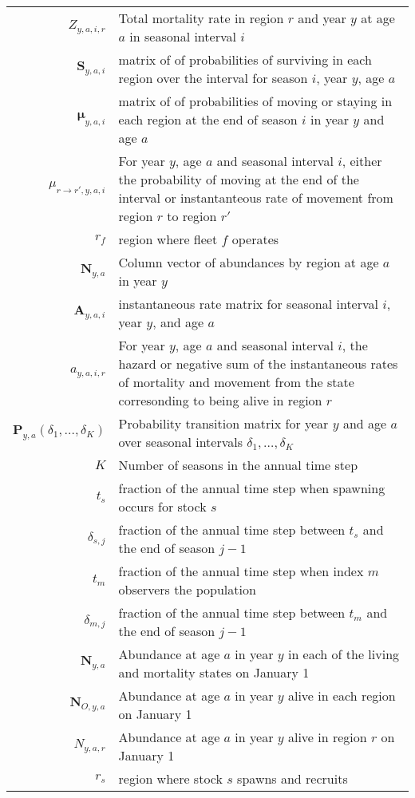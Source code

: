 \begin{longtable}[c]{r p{}}
$Z_{y,a,i,r}$ & Total mortality rate in region $r$ and year $y$ at age $a$ in seasonal interval $i$\\
$\mathbf{S}_{y,a,i}$ & matrix of of probabilities of surviving in each region over the interval for season $i$, year $y$, age $a$ \\
$\boldsymbol{\mu}_{y,a,i}$ & matrix of of probabilities of moving or staying in each region at the end of season $i$ in year $y$ and age $a$ \\
$\mu_{r\rightarrow r',y,a,i}$ & For year $y$, age $a$ and seasonal interval $i$, either the probability of moving at the end of the interval or instantanteous rate of movement from region $r$ to region $r'$\\
$r_f$ & region where fleet $f$ operates\\
$\mathbf{N}_{y,a}$ & Column vector of abundances by region at age $a$ in year $y$\\
$\mathbf{A}_{y,a,i}$ & instantaneous rate matrix for seasonal interval $i$, year $y$, and age $a$\\
$a_{y,a,i,r}$ & For year $y$, age $a$ and seasonal interval $i$, the hazard or negative sum of the instantaneous rates of mortality and movement from the state corresonding to being alive in region $r$ \\
$\mathbf{P}_{y,a}(\delta_1,\ldots,\delta_K)$ & Probability transition matrix for year $y$ and age $a$ over seasonal intervals $\delta_1,\ldots, \delta_K$\\
$K$ & Number of seasons in the annual time step\\
$t_s$ & fraction of the annual time step when spawning occurs for stock $s$\\
$\delta_{s,j}$ & fraction of the annual time step between $t_s$ and the end of season $j-1$\\
$t_m$ & fraction of the annual time step when index $m$ observers the population\\
$\delta_{m,j}$ & fraction of the annual time step between $t_m$ and the end of season $j-1$\\
$\mathbf{N}_{y,a}$ & Abundance at age $a$ in year $y$ in each of the living and mortality states on January 1\\
$\mathbf{N}_{O,y,a}$ & Abundance at age $a$ in year $y$ alive in each region on January 1\\
$N_{y,a,r}$ & Abundance at age $a$ in year $y$ alive in region $r$ on January 1\\
$r_s$ & region where stock $s$ spawns and recruits\\

\end{longtable}
